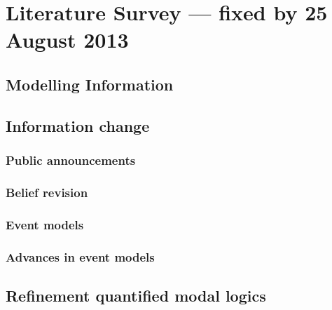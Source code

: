 \section{Literature Survey --- fixed by 25 August 2013}

\subsection{Modelling Information}

\subsection{Information change}

\subsubsection{Public announcements}

\subsubsection{Belief revision}

\subsubsection{Event models}

\subsubsection{Advances in event models}

\subsection{Refinement quantified modal logics}
